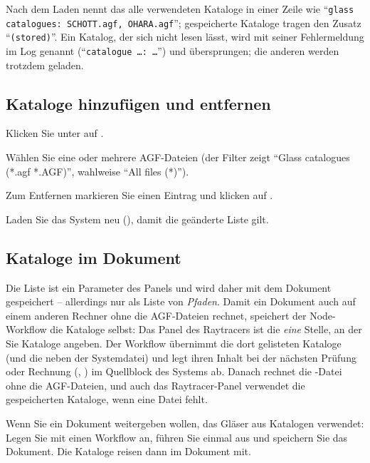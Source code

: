 Nach dem Laden nennt das  alle verwendeten Kataloge in einer Zeile wie
\enquote{\texttt{glass catalogues: SCHOTT.agf, OHARA.agf}}; gespeicherte Kataloge tragen den
Zusatz \enquote{\texttt{(stored)}}. Ein Katalog, der sich nicht lesen lässt, wird mit seiner
Fehlermeldung im Log genannt (\enquote{\texttt{catalogue …: …}}) und übersprungen; die anderen
werden trotzdem geladen.

\subsection{Kataloge hinzufügen und entfernen}

\begin{schritte}
  \item Klicken Sie unter  auf .
  \item Wählen Sie eine oder mehrere AGF-Dateien (der Filter zeigt \enquote{Glass catalogues
    (*.agf *.AGF)}, wahlweise \enquote{All files (*)}).
  \item Zum Entfernen markieren Sie einen Eintrag und klicken auf .
  \item Laden Sie das System neu (), damit die geänderte Liste gilt.
\end{schritte}

\subsection{Kataloge im Dokument}

Die Liste  ist ein Parameter des Panels und wird daher mit dem Dokument
gespeichert -- allerdings nur als Liste von \emph{Pfaden}. Damit ein Dokument auch auf einem
anderen Rechner ohne die AGF-Dateien rechnet, speichert der Node-Workflow die Kataloge selbst:
Das Panel des Raytracers ist die \emph{eine} Stelle, an der Sie Kataloge angeben. Der Workflow
übernimmt die dort gelisteten Kataloge (und die  neben der Systemdatei) und legt
ihren Inhalt bei der nächsten Prüfung oder Rechnung (, )
im Quellblock des Systems ab. Danach rechnet die -Datei ohne die AGF-Dateien, und
auch das Raytracer-Panel verwendet die gespeicherten Kataloge, wenn eine Datei fehlt.

\begin{tipp}
Wenn Sie ein Dokument weitergeben wollen, das Gläser aus Katalogen verwendet: Legen Sie mit
 einen Workflow an, führen Sie einmal  aus und
speichern Sie das Dokument. Die Kataloge reisen dann im Dokument mit.
\end{tipp}

